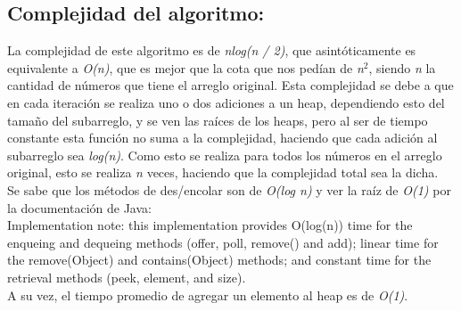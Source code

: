 \documentclass{article}
\begin{document}
		\subsection{Complejidad del algoritmo:}
		La complejidad de este algoritmo es de \textit{nlog(n / 2)}, que asint\'oticamente es equivalente a \textit{O(n)}, que es mejor que la cota que nos ped\'ian de \textit{n$^{2}$}, siendo \textit{n} la cantidad de n\'umeros que tiene el arreglo original. Esta complejidad se debe a que en cada iteraci\'on se realiza uno o dos adiciones a un heap, dependiendo esto del tama\~no del subarreglo, y se ven las ra\'ices de los heaps, pero al ser de tiempo constante esta funci\'on no suma a la complejidad, haciendo que cada adici\'on al subarreglo sea \textit{log(n)}. Como esto se realiza para todos los n\'umeros en el arreglo original, esto se realiza \textit{n} veces, haciendo que la complejidad total sea la dicha.
		\\Se sabe que los m\'etodos de des/encolar son de \textit{O(log n)} y ver la ra\'iz de \textit{O(1)} por la documentaci\'on de Java:
		\\Implementation note: this implementation provides O(log(n)) time for the enqueing and dequeing methods (offer, poll, remove() and add); linear time for the remove(Object) and contains(Object) methods; and constant time for the retrieval methods (peek, element, and size).
		\\A su vez, el tiempo promedio de agregar un elemento al heap es de \textit{O(1)}.
\end{document}
